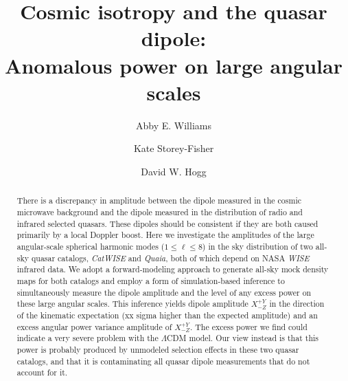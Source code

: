 \documentclass[modern]{aastex631}
\newcommand{\catwise}{\textsl{CatWISE}\xspace}
\newcommand{\quaia}{\textsl{Quaia}\xspace}
\newcommand{\wise}{\textsl{WISE}\xspace}
\begin{document}
\title{Cosmic isotropy and the quasar dipole:\\
Anomalous power on large angular scales}
\author[0000-0001-6069-5383]{Abby E. Williams}

\author[0000-0001-8764-7103]{Kate Storey-Fisher}

\author[0000-0003-2866-9403]{David W. Hogg}

\begin{abstract}\noindent %
    There is a discrepancy in amplitude between the dipole measured in the cosmic microwave background and the dipole measured in the distribution of radio and infrared selected quasars.
    These dipoles should be consistent if they are both caused primarily by a local Doppler boost.
    Here we investigate the amplitudes of the large angular-scale spherical harmonic modes ($1\leq\ell\leq 8$) in the sky distribution of two all-sky quasar catalogs, \catwise and \quaia, both of which depend on NASA\! \wise infrared data.
    We adopt a forward-modeling approach to generate all-sky mock density maps for both catalogs and employ a form of simulation-based inference to simultaneously measure the dipole amplitude and the level of any excess power on these large angular scales.
    This inference yields dipole amplitude $X^{+Y}_{-Z}$ in the direction of the kinematic expectation (xx sigma higher than the expected amplitude) and an excess angular power variance amplitude of $X^{+Y}_{-Z}$.
    The excess power we find could indicate a very severe problem with the $\Lambda$CDM model.
    Our view instead is that this power is probably produced by unmodeled selection effects in these two quasar catalogs, and that it is contaminating all quasar dipole measurements that do not account for it.
\end{abstract}

\end{document}
